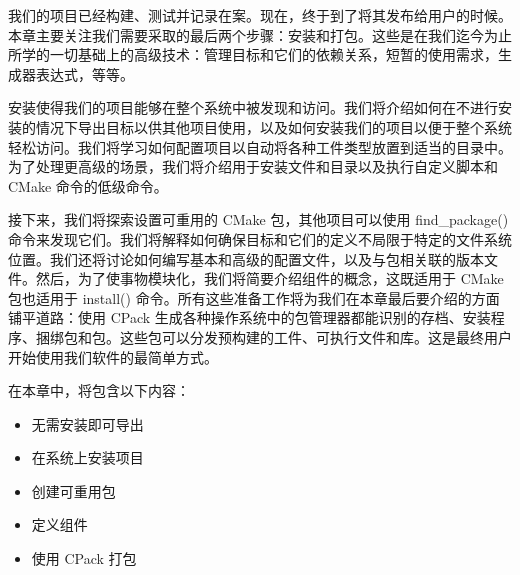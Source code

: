 我们的项目已经构建、测试并记录在案。现在，终于到了将其发布给用户的时候。本章主要关注我们需要采取的最后两个步骤：安装和打包。这些是在我们迄今为止所学的一切基础上的高级技术：管理目标和它们的依赖关系，短暂的使用需求，生成器表达式，等等。

安装使得我们的项目能够在整个系统中被发现和访问。我们将介绍如何在不进行安装的情况下导出目标以供其他项目使用，以及如何安装我们的项目以便于整个系统轻松访问。我们将学习如何配置项目以自动将各种工件类型放置到适当的目录中。为了处理更高级的场景，我们将介绍用于安装文件和目录以及执行自定义脚本和 CMake 命令的低级命令。

接下来，我们将探索设置可重用的 CMake 包，其他项目可以使用 find\_package() 命令来发现它们。我们将解释如何确保目标和它们的定义不局限于特定的文件系统位置。我们还将讨论如何编写基本和高级的配置文件，以及与包相关联的版本文件。然后，为了使事物模块化，我们将简要介绍组件的概念，这既适用于 CMake 包也适用于 install() 命令。所有这些准备工作将为我们在本章最后要介绍的方面铺平道路：使用 CPack 生成各种操作系统中的包管理器都能识别的存档、安装程序、捆绑包和包。这些包可以分发预构建的工件、可执行文件和库。这是最终用户开始使用我们软件的最简单方式。

在本章中，将包含以下内容：

\begin{itemize}
\item
无需安装即可导出

\item
在系统上安装项目

\item
创建可重用包

\item
定义组件

\item
使用 CPack 打包
\end{itemize}








